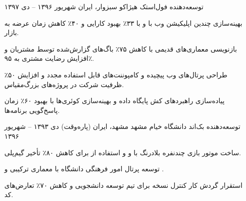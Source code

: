 \begin{cventries}
\cventry
{توسعه‌دهنده فول‌استک} %
{هیژاکو} %
{سبزوار، ایران} %
{شهریور ۱۳۹۶ -- دی ۱۳۹۷} %
{
	\begin{cvitems}
		\item {بهینه‌سازی چندین اپلیکیشن وب با \textbf{} و \textbf{} با ۳۳٪ بهبود کارایی و ۴۰٪ کاهش زمان عرضه به بازار.}
		\item {بازنویسی معماری‌های قدیمی  با کاهش ۷۵٪ باگ‌های گزارش‌شده توسط مشتریان و افزایش رضایت مشتری به ۹۵٪.}
		\item {طراحی پرتال‌های وب پیچیده و کامپوننت‌های قابل استفاده مجدد و افزایش ۵۰٪ ظرفیت شرکت در پروژه‌های بزرگ‌مقیاس.}
		\item {پیاده‌سازی راهبردهای کش پایگاه داده و بهینه‌سازی کوئری‌ها با بهبود ۶۰٪ زمان پاسخ‌گویی برنامه‌ها.}
	\end{cvitems}
}

\cventry
{توسعه‌دهنده بک‌اند} %
{دانشگاه خیام مشهد} %
{مشهد، ایران (پاره‌وقت)} %
{دی ۱۳۹۳ -- شهریور ۱۳۹۶} %
{
	\begin{cvitems}
		\item {ساخت موتور بازی چندنفره بلادرنگ با \textbf{} و \textbf{} و استفاده از \textbf{} برای کاهش ۸۰٪ تأخیر گیم‌پلی.}
		\item {توسعه پرتال امور فرهنگی دانشگاه با معماری ترکیبی \textbf{} و \textbf{\lr{RESTful API}}.}
		\item {استقرار گردش کار کنترل نسخه \textbf{} برای تیم توسعه دانشجویی و کاهش ۷۰٪ تعارض‌های کد.}
	\end{cvitems}
}
\end{cventries}
